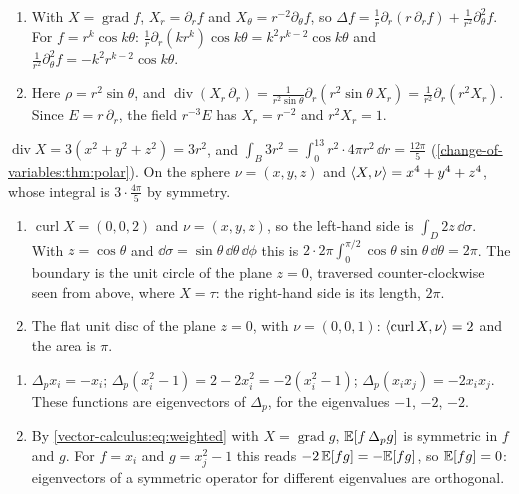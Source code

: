 \begin{enumerate}[nosep]
  \item With $X = \operatorname{grad}f$, $X_r = \partial_rf$ and
        $X_\theta = r^{-2}\partial_\theta f$, so
        $\Delta f = \frac1r\partial_r(r\,\partial_rf)
        + \frac1{r^2}\partial_\theta^2f$. For $f = r^k\cos k\theta$:
        $\frac1r\partial_r(kr^k)\cos k\theta
        = k^2r^{k-2}\cos k\theta$ and
        $\frac1{r^2}\partial_\theta^2f = -k^2r^{k-2}\cos k\theta$.
  \item Here $\rho = r^2\sin\theta$, and
        $\operatorname{div}(X_r\,\partial_r)
        = \frac1{r^2\sin\theta}\partial_r(r^2\sin\theta\,X_r)
        = \frac1{r^2}\partial_r(r^2X_r)$. Since $E = r\,\partial_r$,
        the field $r^{-3}E$ has $X_r = r^{-2}$ and $r^2X_r = 1$.
\end{enumerate}

$\operatorname{div}X = 3(x^2 + y^2 + z^2) = 3r^2$, and
$\int_B3r^2 = \int_0^13r^2\cdot4\pi r^2\,\dd r = \frac{12\pi}5$
(\cref{change-of-variables:thm:polar}). On the sphere $\nu = (x, y, z)$
and $\left\langle X, \nu \right\rangle = x^4 + y^4 + z^4$, whose integral is
$3\cdot\frac{4\pi}5$ by symmetry.

\begin{enumerate}[nosep]
  \item $\operatorname{curl}X = (0, 0, 2)$ and $\nu = (x, y, z)$, so
        the left-hand side is $\int_D2z\,\dd\sigma$. With
        $z = \cos\theta$ and $\dd\sigma = \sin\theta\,\dd\theta\,\dd\phi$
        this is
        $2\cdot2\pi\int_0^{\pi/2}\cos\theta\sin\theta\,\dd\theta
        = 2\pi$. The boundary is the unit circle of the plane $z = 0$,
        traversed counter-clockwise seen from above, where $X = \tau$:
        the right-hand side is its length, $2\pi$.
  \item The flat unit disc of the plane $z = 0$, with $\nu = (0, 0, 1)$:
        $\left\langle \operatorname{curl}X, \nu \right\rangle = 2$ and the area is $\pi$.
\end{enumerate}

\begin{enumerate}[nosep]
  \item $\Delta_px_i = -x_i$;
        $\Delta_p(x_i^2 - 1) = 2 - 2x_i^2 = -2(x_i^2 - 1)$;
        $\Delta_p(x_ix_j) = -2x_ix_j$. These functions are
        eigenvectors of $\Delta_p$, for the eigenvalues $-1$, $-2$,
        $-2$.
  \item By \eqref{vector-calculus:eq:weighted} with
        $X = \operatorname{grad}g$, $\mathbb{E}[f\,\Delta_pg]$ is symmetric in
        $f$ and $g$. For $f = x_i$ and $g = x_j^2 - 1$ this reads
        $-2\,\mathbb{E}[fg] = -\mathbb{E}[fg]$, so $\mathbb{E}[fg] = 0$: eigenvectors of a
        symmetric operator for different eigenvalues are orthogonal.
\end{enumerate}

